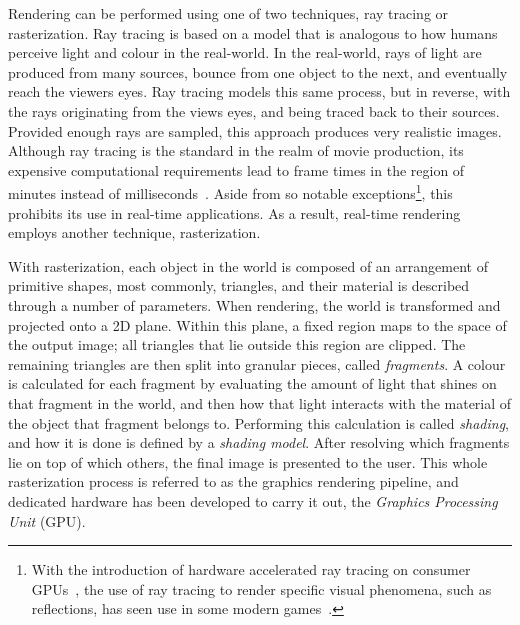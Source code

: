Rendering can be performed using one of two techniques, ray tracing or rasterization. Ray tracing is based on a model that is analogous to how humans perceive light and colour in the real-world. In the real-world, rays of light are produced from many sources, bounce from one object to the next, and eventually reach the viewers eyes. Ray tracing models this same process, but in reverse, with the rays originating from the views eyes, and being traced back to their sources. Provided enough rays are sampled, this approach produces very realistic images. Although ray tracing is the standard in the realm of movie production, its expensive computational requirements lead to frame times in the region of minutes instead of milliseconds~\cite{PixarCars}. Aside from so notable exceptions\footnote{With the introduction of hardware accelerated ray tracing on consumer GPUs~\cite{NvidiaTuringArchitecture}, the use of ray tracing to render specific visual phenomena, such as reflections, has seen use in some modern games~\cite{Battlefield5RayTracing}.}, this prohibits its use in real-time applications. As a result, real-time rendering employs another technique, rasterization.

With rasterization, each object in the world is composed of an arrangement of primitive shapes, most commonly, triangles, and their material is described through a number of parameters. When rendering, the world is transformed and projected onto a 2D plane. Within this plane, a fixed region maps to the space of the output image; all triangles that lie outside this region are clipped. The remaining triangles are then split into granular pieces, called \textit{fragments}. A colour is calculated for each fragment by evaluating the amount of light that shines on that fragment in the world, and then how that light interacts with the material of the object that fragment belongs to. Performing this calculation is called \textit{shading}, and how it is done is defined by a \textit{shading model}. After resolving which fragments lie on top of which others, the final image is presented to the user. This whole rasterization process is referred to as the graphics rendering pipeline, and dedicated hardware has been developed to carry it out, the \textit{Graphics Processing Unit} (GPU).


